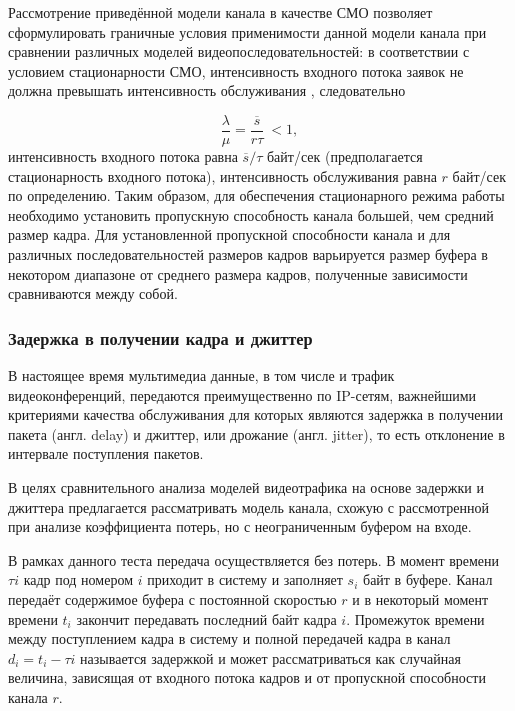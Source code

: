 Рассмотрение приведённой модели канала в качестве СМО позволяет
сформулировать граничные условия применимости данной модели
канала при сравнении различных моделей видеопоследовательностей:
в соответствии с условием стационарности СМО, интенсивность
входного потока заявок не должна превышать интенсивность обслуживания
\cite{},
следовательно

\begin{equation}
    \frac{\lambda}{\mu} = \frac{\overline{s}}{r\tau} \ < 1,
\end{equation}
интенсивность входного потока равна $\overline{s}/\tau$ байт/сек
(предполагается стационарность входного потока),
интенсивность обслуживания равна $r$ байт/сек по определению.
Таким образом, для обеспечения стационарного режима работы необходимо
установить пропускную способность канала большей, чем средний размер
кадра. Для установленной пропускной способности канала и для различных
последовательностей размеров кадров варьируется размер буфера в некотором
диапазоне от среднего размера кадров, полученные зависимости
сравниваются между собой.

\subsubsection{Задержка в получении кадра и джиттер}
\hspace{3pt}

В настоящее время мультимедиа данные, в том числе и трафик видеоконференций,
передаются преимущественно по IP-сетям, важнейшими критериями качества обслуживания
для которых
являются задержка в получении пакета (англ. delay) и джиттер, или дрожание
(англ. jitter), то есть отклонение в интервале поступления пакетов.

В целях сравнительного анализа моделей видеотрафика на основе задержки
и джиттера предлагается рассматривать модель канала, схожую с рассмотренной
при анализе коэффициента потерь, но с неограниченным буфером на входе.

В рамках данного теста передача осуществляется без потерь. В момент времени
$\tau i$ кадр под номером $i$ приходит в систему и заполняет $s_i$
байт в буфере. Канал передаёт содержимое буфера с постоянной скоростью
$r$ и в некоторый момент времени $t_i$ закончит передавать последний
байт кадра $i$. Промежуток времени между поступлением кадра в систему и полной
передачей кадра в канал $d_i = t_i - \tau i$ называется задержкой
и может рассматриваться как случайная величина, зависящая от
входного потока кадров и от пропускной способности канала $r$.

